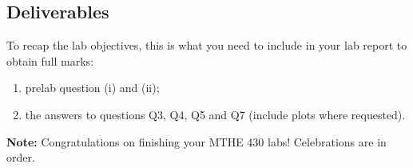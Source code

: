 \documentclass[12pt]{report}
\begin{document}
\begin{enumerate}
\end{enumerate}

\newpage
\subsection{Deliverables}
To recap the lab objectives, this is what you need to include in your lab report to obtain full marks:
\begin{enumerate}
    \item prelab question (i) and (ii);
    \item the answers to questions Q3, Q4, Q5 and Q7 (include plots where requested).
\end{enumerate}
\textbf{Note:} Congratulations on finishing your MTHE 430 labs! Celebrations are in order.


%

\end{document}
